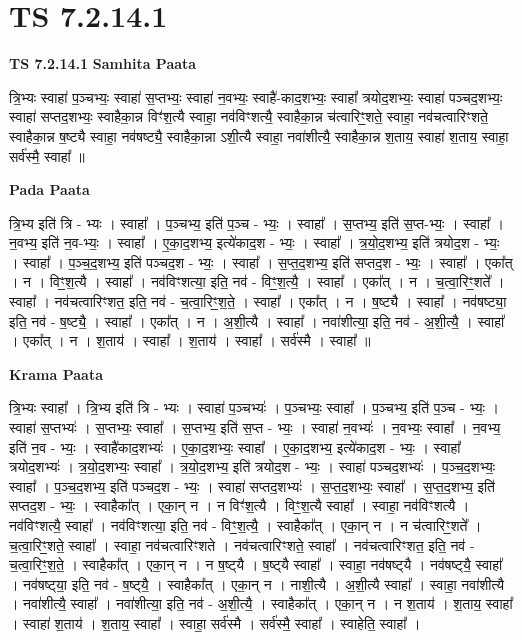 \documentclass[17pt]{extarticle}
\begin{document}
\section{ TS 7.2.14.1 }

\textbf{TS 7.2.14.1 } \newline
\textbf{Samhita Paata} \newline

त्रि॒भ्यः स्वाहा॑ प॒ञ्चभ्यः॒ स्वाहा॑ स॒प्तभ्यः॒ स्वाहा॑ न॒वभ्यः॒ स्वाहै॑-काद॒शभ्यः॒ स्वाहा᳚ त्रयोद॒शभ्यः॒ स्वाहा॑ पञ्चद॒शभ्यः॒ स्वाहा॑ सप्तद॒शभ्यः॒ स्वाहैका॒न्न विꣳ॑श॒त्यै स्वाहा॒ नव॑विꣳशत्यै॒ स्वाहैका॒न्न च॑त्वारिꣳ॒॒शते॒ स्वाहा॒ नव॑चत्वारिꣳशते॒ स्वाहैका॒न्न ष॒ष्ट्यै स्वाहा॒ नव॑षष्ट्यै॒ स्वाहैका॒न्ना ऽशी॒त्यै स्वाहा॒ नवा॑शीत्यै॒ स्वाहैका॒न्न श॒ताय॒ स्वाहा॑ श॒ताय॒ स्वाहा॒ सर्व॑स्मै॒ स्वाहा᳚ ॥ \newline

\textbf{Pada Paata} \newline

त्रि॒भ्य इति॑ त्रि - भ्यः । स्वाहा᳚ । प॒ञ्चभ्य॒ इति॑ प॒ञ्च - भ्यः॒ । स्वाहा᳚ । स॒प्तभ्य॒ इति॑ स॒प्त-भ्यः॒ । स्वाहा᳚ । न॒वभ्य॒ इति॑ न॒व-भ्यः॒ । स्वाहा᳚ । ए॒का॒द॒शभ्य॒ इत्ये॑काद॒श - भ्यः॒ । स्वाहा᳚ । त्र॒यो॒द॒शभ्य॒ इति॑ त्रयोद॒श - भ्यः॒ । स्वाहा᳚ । प॒ञ्च॒द॒शभ्य॒ इति॑ पञ्चद॒श - भ्यः॒ । स्वाहा᳚ । स॒प्त॒द॒शभ्य॒ इति॑ सप्तद॒श - भ्यः॒ । स्वाहा᳚ । एका᳚त् । न । विꣳ॒॒श॒त्यै । स्वाहा᳚ । नव॑विꣳशत्या॒ इति॒ नव॑ - विꣳ॒॒श॒त्यै॒ । स्वाहा᳚ । एका᳚त् । न । च॒त्वा॒रिꣳ॒॒शते᳚ । स्वाहा᳚ । नव॑चत्वारिꣳशत॒ इति॒ नव॑ - च॒त्वा॒रिꣳ॒॒श॒ते॒ । स्वाहा᳚ । एका᳚त् । न । ष॒ष्ट्यै । स्वाहा᳚ । नव॑षष्ट्या॒ इति॒ नव॑ - ष॒ष्ट्यै॒ । स्वाहा᳚ । एका᳚त् । न । अ॒शी॒त्यै । स्वाहा᳚ । नवा॑शीत्या॒ इति॒ नव॑ - अ॒शी॒त्यै॒ । स्वाहा᳚ । एका᳚त् । न । श॒ताय॑ । स्वाहा᳚ । श॒ताय॑ । स्वाहा᳚ । सर्व॑स्मै । स्वाहा᳚ ॥  \newline


\textbf{Krama Paata} \newline

त्रि॒भ्यः स्वाहा᳚ । त्रि॒भ्य इति॑ त्रि - भ्यः । स्वाहा॑ प॒ञ्चभ्यः॑ । प॒ञ्चभ्यः॒ स्वाहा᳚ । प॒ञ्चभ्य॒ इति॑ प॒ञ्च - भ्यः॒ । स्वाहा॑ स॒प्तभ्यः॑ । स॒प्तभ्यः॒ स्वाहा᳚ । स॒प्तभ्य॒ इति॑ स॒प्त - भ्यः॒ । स्वाहा॑ न॒वभ्यः॑ । न॒वभ्यः॒ स्वाहा᳚ । न॒वभ्य॒ इति॑ न॒व - भ्यः॒ । स्वाहै॑काद॒शभ्यः॑ । ए॒का॒द॒शभ्यः॒ स्वाहा᳚ । ए॒का॒द॒शभ्य॒ इत्ये॑काद॒श - भ्यः॒ । स्वाहा᳚ त्रयोद॒शभ्यः॑ । त्र॒यो॒द॒शभ्यः॒ स्वाहा᳚ । त्र॒यो॒द॒शभ्य॒ इति॑ त्रयोद॒श - भ्यः॒ । स्वाहा॑ पञ्चद॒शभ्यः॑ । प॒ञ्च॒द॒शभ्यः॒ स्वाहा᳚ । प॒ञ्च॒द॒शभ्य॒ इति॑ पञ्चद॒श - भ्यः॒ । स्वाहा॑ सप्तद॒शभ्यः॑ । स॒प्त॒द॒शभ्यः॒ स्वाहा᳚ । स॒प्त॒द॒शभ्य॒ इति॑ सप्तद॒श - भ्यः॒ । स्वाहैका᳚त् । एका॒न् न । न विꣳ॑श॒त्यै । विꣳ॒॒श॒त्यै स्वाहा᳚ । स्वाहा॒ नव॑विꣳशत्यै । नव॑विꣳशत्यै॒ स्वाहा᳚ । नव॑विꣳशत्या॒ इति॒ नव॑ - विꣳ॒॒श॒त्यै॒ । स्वाहैका᳚त् । एका॒न् न । न च॑त्वारिꣳ॒॒शते᳚ । च॒त्वा॒रिꣳ॒॒शते॒ स्वाहा᳚ । स्वाहा॒ नव॑चत्वारिꣳशते । नव॑चत्वारिꣳशते॒ स्वाहा᳚ । नव॑चत्वारिꣳशत॒ इति॒ नव॑ - च॒त्वा॒रिꣳ॒॒श॒ते॒ । स्वाहैका᳚त् । एका॒न् न । न ष॒ष्ट्‍यै । ष॒ष्ट्‍यै स्वाहा᳚ । स्वाहा॒ नव॑षष्ट्‍यै । नव॑षष्ट्‍यै॒ स्वाहा᳚ । नव॑षष्ट्‍या॒ इति॒ नव॑ - ष॒ष्ट्‍यै॒ । स्वाहैका᳚त् । एका॒न् न । नाशी॒त्यै । अ॒शी॒त्यै स्वाहा᳚ । स्वाहा॒ नवा॑शीत्यै । नवा॑शीत्यै॒ स्वाहा᳚ । नवा॑शीत्या॒ इति॒ नव॑ - अ॒शी॒त्यै॒ । स्वाहैका᳚त् । एका॒न् न । न श॒ताय॑ । श॒ताय॒ स्वाहा᳚ । स्वाहा॑ श॒ताय॑ । श॒ताय॒ स्वाहा᳚ । स्वाहा॒ सर्व॑स्मै । सर्व॑स्मै॒ स्वाहा᳚ । स्वाहेति॒ स्वाहा᳚ । \newline
\end{document}
